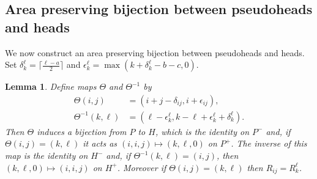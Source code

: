 \documentclass[11pt,reqno]{amsart}
\newtheorem{lemma}[theorem]{Lemma}
\theoremstyle{definition}
\numberwithin{equation}{section}
\begin{document}
\subsection{Area preserving bijection between pseudoheads and heads}
\label{section.heads}

We now construct an area preserving bijection between pseudoheads and heads.
Set $\delta_k^\ell=\lceil\frac{\ell-a}{2}\rceil$ and $\epsilon_k^\ell=\max(k+\delta_k^\ell-b-c,0)$. 
\begin{lemma}
Define maps $\Theta$ and $\Theta^{-1}$ by
\begin{equation*}
\begin{split}
	 \Theta(i,j)&=(i+j-\delta_{ij},i+\epsilon_{ij}),\\
	 \Theta^{-1}(k,\ell)&=(\ell-\epsilon_k^\ell,k-\ell+\epsilon_k^{\ell}+\delta_k^\ell).
\end{split}
\end{equation*}
Then $\Theta$ induces a bijection from $P$ to $H$, which is the identity on $P^-$ and, if $\Theta(i,j)=(k,\ell)$ it acts as
$(i,i,j) \mapsto (k,\ell,0)$ on $P^+$.  The inverse of this map is the identity on $H^-$ and, if $\Theta^{-1}(k,\ell)=(i,j)$,
then $(k,\ell,0) \mapsto (i,i,j)$ on $H^+$.  Moreover if $\Theta(i,j)=(k,\ell)$ then $R_{ij}=R_k^\ell$.
\end{lemma}
\end{document}
